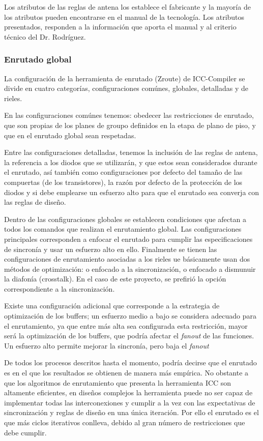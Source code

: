 Los atributos de las reglas de antena los establece el fabricante y la mayoría de los atributos pueden encontrarse en el manual de la tecnología. Los atributos presentados, responden a la información que aporta el manual y al criterio técnico del Dr. Rodríguez.

\subsubsection*{Enrutado global}

La configuración de la herramienta de enrutado (Zroute) de ICC-Compiler se divide en cuatro categorías, configuraciones comúnes, globales, detalladas y de rieles.

En las configuraciones comúnes tenemos: obedecer las restricciones de enrutado, que son propias de los planes de groupo definidos en la etapa de plano de piso, y que en el enrutado global sean respetadas.

Entre las configuraciones detalladas, tenemos la inclusión de las reglas de antena, la referencia a los diodos que se utilizarán, y que estos sean considerados durante el enrutado, así también como configuraciones por defecto del tamaño de las compuertas (de los transistores), la razón por defecto de la protección de los diodos y si debe emplearse un esfuerzo alto para que el enrutado sea converja con las reglas de diseño.

Dentro de las configuraciones globales se establecen condiciones que afectan a todos los comandos que realizan el enrutamiento global. Las configuraciones principales corresponden a enfocar el enrutado para cumplir las especificaciones de sincronía y usar un esfuerzo alto en ello. Finalmente se tienen las configuraciones de enrutamiento asociadas a los rieles ue básicamente usan dos métodos de optimización: o enfocado a la sincronización, o enfocado a dismunuir la diafonía (crosstalk). En el caso de este proyecto, se prefirió la opción correspondiente a la sincronización.

Existe una configuración adicional que corresponde a la estrategia de optimización de los buffers; un esfuerzo medio a bajo se considera adecuado para el enrutamiento, ya que entre más alta sea configurada esta restricción, mayor será la optimización de los buffers, que podría afectar el \textit{fanout} de las funciones. Un esfuerzo alto permite mejorar la sincronía, pero baja el \textit{fanout}

De todos los procesos descritos hasta el momento, podría decirse que el enrutado es en el que los resultados se obtienen de manera más empírica. No obstante a que los algoritmos de enrutamiento que presenta la herramienta ICC son altamente eficientes, en diseños complejos la herramienta puede no ser capaz de implementar todas las interconexiones y cumplir a la vez con las expectativas de sincronización y reglas de diseño en una única iteración. Por ello el enrutado es el que más ciclos iterativos conlleva, debido al gran número de restricciones que debe cumplir.

